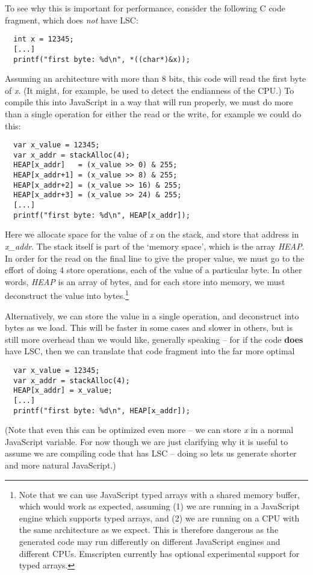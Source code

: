 \documentclass[11pt]{proc}
\begin{document}
To see why this is important for performance, consider the following
C code fragment, which does \emph{not} have LSC:
\begin{verbatim}
  int x = 12345;
  [...]
  printf("first byte: %d\n", *((char*)&x));
\end{verbatim}
Assuming an architecture with more than 8 bits, this code will read
the first byte of \emph{x}. (It might, for example, be used to detect the
endianness of the CPU.) To compile this into JavaScript in
a way that will run properly, we must do more than a single operation
for either the read or the write, for example we could do this:
\begin{verbatim}
  var x_value = 12345;
  var x_addr = stackAlloc(4);
  HEAP[x_addr]   = (x_value >> 0) & 255;
  HEAP[x_addr+1] = (x_value >> 8) & 255;
  HEAP[x_addr+2] = (x_value >> 16) & 255;
  HEAP[x_addr+3] = (x_value >> 24) & 255;
  [...]
  printf("first byte: %d\n", HEAP[x_addr]);
\end{verbatim}
Here we allocate space for the value of \emph{x} on the stack, and
store that address in \emph{x\_addr}. The stack itself is part of
the `memory space', which is the array \emph{HEAP}. In order for
the read on the final line to give the proper value, we must go to
the effort of doing 4 store operations, each of the value of a
particular byte. In other words, \emph{HEAP} is an array of bytes,
and for each store into memory, we must deconstruct the value into
bytes.\footnote{Note that we can use JavaScript typed arrays with a shared memory
buffer, which would work as expected, assuming (1) we are running
in a JavaScript engine which supports typed arrays, and (2) we
are running on a CPU with the same architecture as we expect. This
is therefore dangerous as the generated code may run differently on
different JavaScript engines and different CPUs.
Emscripten currently has optional experimental support for typed arrays.}

Alternatively, we can store the value in a single operation, and
deconstruct into bytes as we load. This will be faster in some
cases and slower in others, but is still more overhead
than we would like, generally speaking -- for if the code \textbf{does} have
LSC, then we can translate that code fragment into
the far more optimal
\begin{verbatim}
  var x_value = 12345;
  var x_addr = stackAlloc(4);
  HEAP[x_addr] = x_value;
  [...]
  printf("first byte: %d\n", HEAP[x_addr]);
\end{verbatim}
(Note that even this can be optimized even more -- we can store
\emph{x} in a normal JavaScript variable. For now though we are
just clarifying why it is useful to assume we are compiling code
that has LSC -- doing so lets us generate shorter and more natural
JavaScript.)
\end{document}
